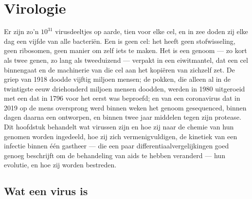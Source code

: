 \chapter{Virologie}\label{ch:b3:virology}

Er zijn zo'n $10^{31}$ virusdeeltjes op aarde, tien voor elke cel, en in
zee doden zij elke dag een vijfde van alle bacteriën. Een  is geen
cel: het heeft geen stofwisseling, geen ribosomen, geen manier om zelf
iets te maken. Het is een genoom --- zo kort als twee genen, zo lang
als tweeduizend --- verpakt in een eiwitmantel, dat een cel binnengaat
en de machinerie van die cel aan het kopiëren van zichzelf zet. De
griep van 1918 doodde vijftig miljoen mensen; de pokken, die alleen al
in de twintigste eeuw driehonderd miljoen mensen doodden, werden in
1980 uitgeroeid met een  dat in 1796 voor het eerst was
beproefd; en van een coronavirus dat in 2019 op de mens oversprong werd
binnen weken het genoom gesequenced, binnen dagen daarna een 
ontworpen, en binnen twee jaar middelen tegen zijn protease. Dit
hoofdstuk behandelt wat virussen zijn en hoe zij naar de chemie van hun
genomen worden ingedeeld, hoe zij zich vermenigvuldigen, de kinetiek
van een infectie binnen één gastheer --- die een paar
differentiaalvergelijkingen goed genoeg beschrijft om de behandeling van
aids te hebben veranderd --- hun evolutie, en hoe zij worden bestreden.

\section{Wat een virus is}


